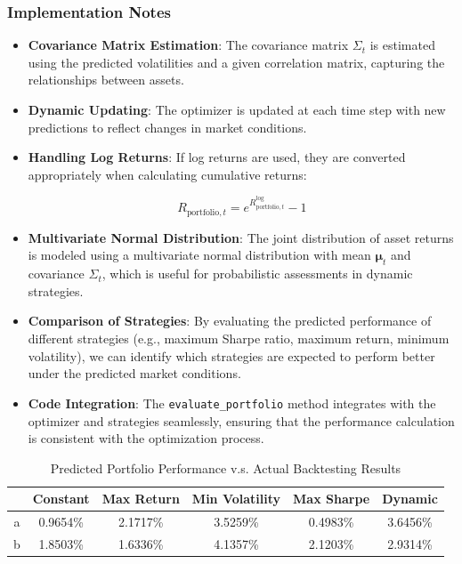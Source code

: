 \subsubsection{Implementation Notes}

\begin{itemize}
    \item \textbf{Covariance Matrix Estimation}: The covariance matrix \( \Sigma_t \) is estimated using the predicted volatilities and a given correlation matrix, capturing the relationships between assets.

    \item \textbf{Dynamic Updating}: The optimizer is updated at each time step with new predictions to reflect changes in market conditions.

    \item \textbf{Handling Log Returns}: If log returns are used, they are converted appropriately when calculating cumulative returns:

    \[
    R_{\text{portfolio}, t} = e^{R_{\text{portfolio}, t}^{\text{log}}} - 1
    \]

    \item \textbf{Multivariate Normal Distribution}: The joint distribution of asset returns is modeled using a multivariate normal distribution with mean \( \boldsymbol{\mu}_t \) and covariance \( \Sigma_t \), which is useful for probabilistic assessments in dynamic strategies.

    \item \textbf{Comparison of Strategies}: By evaluating the predicted performance of different strategies (e.g., maximum Sharpe ratio, maximum return, minimum volatility), we can identify which strategies are expected to perform better under the predicted market conditions.

    \item \textbf{Code Integration}: The \texttt{evaluate\_portfolio} method integrates with the optimizer and strategies seamlessly, ensuring that the performance calculation is consistent with the optimization process.
\end{itemize}

\begin{table}[htbp]
\centering
\caption{Predicted Portfolio Performance v.s. Actual Backtesting Results}
\label{tab:predicted_vs_actual}
\begin{tabular}{cccccc}
\toprule
 &\textbf{Constant} & \textbf{Max Return} & \textbf{Min Volatility} & \textbf{Max Sharpe} & \textbf{Dynamic} \\
\midrule
a&0.9654\%  & 2.1717\% & 3.5259\% & 0.4983\% & 3.6456\% \\
b&1.8503\% & 1.6336\% & 4.1357\% & 2.1203\% & 2.9314\% \\

\bottomrule
\end{tabular}
\end{table}

